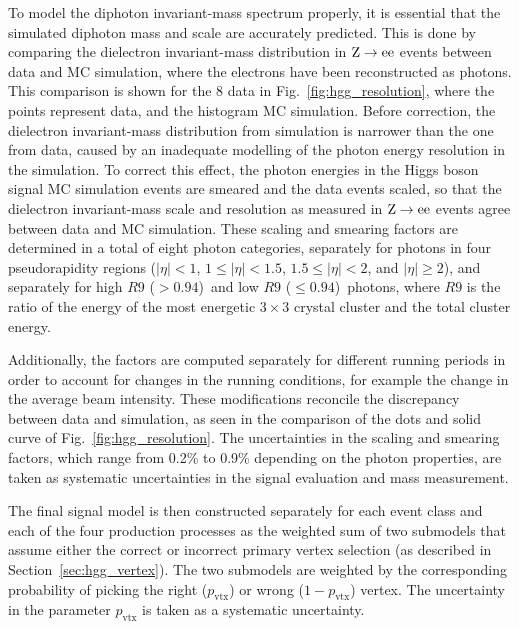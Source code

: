\documentclass[12pt,twoside,a4paper,cmspaper,final,collab]{cms-tdr}
\begin{document}
To model the diphoton invariant-mass spectrum properly, it is essential that
the simulated diphoton mass and scale are accurately predicted.
This is done by comparing the dielectron invariant-mass distribution in
$\mathrm{Z}\to \mathrm{e}\mathrm{e}$ events between data and MC simulation, where the electrons have been
reconstructed as photons. This comparison is shown for the 8\TeV
data in Fig.~\ref{fig:hgg_resolution}, where the points represent
data, and the histogram MC simulation.
Before correction, the dielectron invariant-mass distribution from simulation is narrower than the one from data,
caused by an inadequate modelling of the photon energy resolution in the simulation.
To correct this effect, the photon energies in the Higgs boson signal MC simulation events
are smeared and the data events scaled, so that the dielectron invariant-mass scale and
resolution as measured in $\mathrm{Z}\to \mathrm{e}\mathrm{e}$ events agree between data and MC simulation.
These scaling and smearing factors are determined in a total of eight photon categories, \ie
separately for photons in four pseudorapidity regions
($|\eta|<1$, $1\leq|\eta|<1.5$, $1.5\leq|\eta|<2$, and $|\eta| \geq 2$),
and separately for high $R9$ (${>}0.94$)~and low $R9$ (${\leq}0.94$)~photons, where $R9$ is the ratio of the
energy of the  most energetic $3\times3$ crystal cluster and the total cluster energy.

Additionally, the factors are computed separately for different running periods
in order to account for changes in the running conditions, for example the change
in the average beam intensity.
These modifications reconcile the discrepancy between data and simulation,
as seen in the comparison of the dots and solid curve of
Fig.~\ref{fig:hgg_resolution}. The uncertainties
in the scaling and smearing factors, which
range from 0.2\% to 0.9\% depending on the photon properties, are taken as
systematic uncertainties in the signal evaluation and mass measurement.

The final signal model is then constructed separately for each event class
and each of the four production processes as the weighted sum of two submodels
that assume either the correct or incorrect primary vertex selection (as described in Section~\ref{sec:hgg_vertex}).
The two submodels are weighted by the corresponding probability
of picking the right ($p_\mathrm{vtx}$) or wrong ($1-p_\mathrm{vtx}$) vertex.
The uncertainty in the parameter $p_\mathrm{vtx}$ is taken as a systematic uncertainty.
\end{document}
